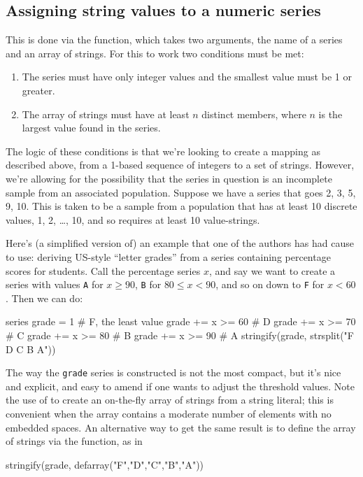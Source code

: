 \subsection{Assigning string values to a numeric series}
\label{sec:stringify}

This is done via the  function, which takes two
arguments, the name of a series and an array of strings. For this to
work two conditions must be met:

\begin{enumerate}
\item The series must have only integer values and the smallest value
  must be 1 or greater.
\item The array of strings must have at least $n$ distinct members,
  where $n$ is the largest value found in the series.
\end{enumerate}

The logic of these conditions is that we're looking to create a
mapping as described above, from a 1-based sequence of integers to a
set of strings. However, we're allowing for the possibility that the
series in question is an incomplete sample from an associated
population. Suppose we have a series that goes 2, 3, 5, 9, 10. This is
taken to be a sample from a population that has at least 10 discrete
values, 1, 2, \dots{}, 10, and so requires at least 10 value-strings.

Here's (a simplified version of) an example that one of the authors
has had cause to use: deriving US-style ``letter grades'' from a
series containing percentage scores for students. Call the percentage
series $x$, and say we want to create a series with values \texttt{A}
for $x \geq 90$, \texttt{B} for $80 \leq x <90$, and so on down to
\texttt{F} for $x<60$. Then we can do:
\begin{code}
series grade = 1 # F, the least value
grade += x >= 60 # D
grade += x >= 70 # C
grade += x >= 80 # B
grade += x >= 90 # A
stringify(grade, strsplit("F D C B A"))
\end{code}
%
The way the \texttt{grade} series is constructed is not the most
compact, but it's nice and explicit, and easy to amend if one wants to
adjust the threshold values. Note the use of  to
create an on-the-fly array of strings from a string literal; this is
convenient when the array contains a moderate number of elements with
no embedded spaces. An alternative way to get the same result is to
define the array of strings via the  function, as in
\begin{code}
stringify(grade, defarray("F","D","C","B","A"))
\end{code}

